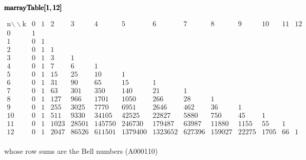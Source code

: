 \documentclass{article}
\begin{document}
\begin{doublespace}
\noindent\(\pmb{\text{marrayTable}[}\\
\pmb{1,12]}\)
\end{doublespace}

\begin{doublespace}
\noindent\(\begin{array}{rrrrrrrrrrrrrr}
 \text{n$\backslash \backslash $k} & 0 & 1 & 2 & 3 & 4 & 5 & 6 & 7 & 8 & 9 & 10 & 11 & 12 \\
 0 & 1 & \text{} & \text{} & \text{} & \text{} & \text{} & \text{} & \text{} & \text{} & \text{} & \text{} & \text{} & \text{} \\
 1 & 0 & 1 & \text{} & \text{} & \text{} & \text{} & \text{} & \text{} & \text{} & \text{} & \text{} & \text{} & \text{} \\
 2 & 0 & 1 & 1 & \text{} & \text{} & \text{} & \text{} & \text{} & \text{} & \text{} & \text{} & \text{} & \text{} \\
 3 & 0 & 1 & 3 & 1 & \text{} & \text{} & \text{} & \text{} & \text{} & \text{} & \text{} & \text{} & \text{} \\
 4 & 0 & 1 & 7 & 6 & 1 & \text{} & \text{} & \text{} & \text{} & \text{} & \text{} & \text{} & \text{} \\
 5 & 0 & 1 & 15 & 25 & 10 & 1 & \text{} & \text{} & \text{} & \text{} & \text{} & \text{} & \text{} \\
 6 & 0 & 1 & 31 & 90 & 65 & 15 & 1 & \text{} & \text{} & \text{} & \text{} & \text{} & \text{} \\
 7 & 0 & 1 & 63 & 301 & 350 & 140 & 21 & 1 & \text{} & \text{} & \text{} & \text{} & \text{} \\
 8 & 0 & 1 & 127 & 966 & 1701 & 1050 & 266 & 28 & 1 & \text{} & \text{} & \text{} & \text{} \\
 9 & 0 & 1 & 255 & 3025 & 7770 & 6951 & 2646 & 462 & 36 & 1 & \text{} & \text{} & \text{} \\
 10 & 0 & 1 & 511 & 9330 & 34105 & 42525 & 22827 & 5880 & 750 & 45 & 1 & \text{} & \text{} \\
 11 & 0 & 1 & 1023 & 28501 & 145750 & 246730 & 179487 & 63987 & 11880 & 1155 & 55 & 1 & \text{} \\
 12 & 0 & 1 & 2047 & 86526 & 611501 & 1379400 & 1323652 & 627396 & 159027 & 22275 & 1705 & 66 & 1 \\
\end{array}\)
\end{doublespace}

whose row sums are the Bell numbers (A000110)
\end{document}
